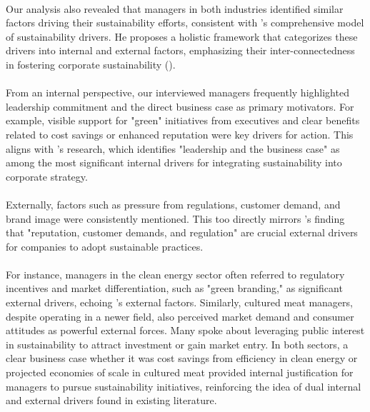 	\paragraph*{} Our analysis also revealed that managers in both industries identified similar factors driving their sustainability efforts, consistent with \citeauthor{Lozano2015}'s comprehensive model of sustainability drivers. He proposes a holistic framework that categorizes these drivers into internal and external factors, emphasizing their inter-connectedness in fostering corporate sustainability (\textcite{Lozano2015}).
	
	\paragraph*{} From an internal perspective, our interviewed managers frequently highlighted leadership commitment and the direct business case as primary motivators. For example, visible support for "green" initiatives from executives and clear benefits related to cost savings or enhanced reputation were key drivers for action. This aligns with \citeauthor{Lozano2015}'s research, which identifies "leadership and the business case" as among the most significant internal drivers for integrating sustainability into corporate strategy.
	
	\paragraph*{} Externally, factors such as pressure from regulations, customer demand, and brand image were consistently mentioned. This too directly mirrors \citeauthor{Lozano2015}'s finding that "reputation, customer demands, and regulation" are crucial external drivers for companies to adopt sustainable practices.
	
	\paragraph*{} For instance, managers in the clean energy sector often referred to regulatory incentives and market differentiation, such as "green branding," as significant external drivers, echoing \citeauthor{Lozano2015}'s external factors. Similarly, cultured meat managers, despite operating in a newer field, also perceived market demand and consumer attitudes as powerful external forces. Many spoke about leveraging public interest in sustainability to attract investment or gain market entry. In both sectors, a clear business case whether it was cost savings from efficiency in clean energy or projected economies of scale in cultured meat provided internal justification for managers to pursue sustainability initiatives, reinforcing the idea of dual internal and external drivers found in existing literature.
	
